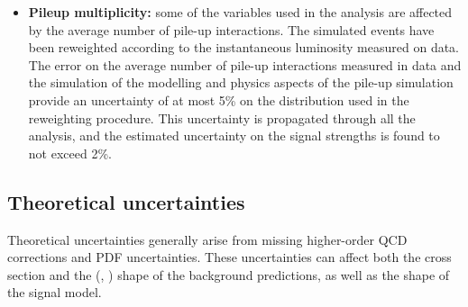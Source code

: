 \begin{itemize}
\item {\bf Pileup multiplicity:} 
some of the variables used in the analysis are affected by the average number of pile-up interactions. The simulated events have been reweighted according to the instantaneous luminosity measured on data. The error on the average number of pile-up interactions measured in data and the simulation of the modelling and physics aspects of the pile-up simulation provide an uncertainty of at most 5\% on the distribution used in the reweighting procedure. This uncertainty is propagated through all the analysis, and the estimated uncertainty on the signal strengths is found to not exceed 2\%.
\end{itemize}

\subsection{Theoretical uncertainties \label{subsec:thsyst}}

Theoretical uncertainties generally arise from missing higher-order QCD corrections and PDF uncertainties. These uncertainties can affect both the cross section and the (\mll, \mt) shape of the background predictions, as well as the shape of the signal model.

